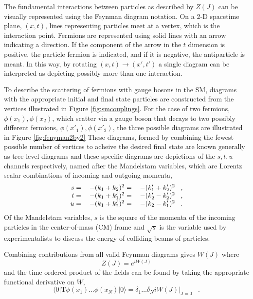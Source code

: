  The fundamental interactions between particles 
  as described by $Z(J)$ 
  can be visually represented using the Feynman
  diagram notation. 
 On a 2-D spacetime plane, $(x,t)$,
  lines representing particles meet
  at a vertex, which is the interaction point.
 Fermions are represented using solid lines
  with an arrow indicating a direction.
 If the component of the arrow in the $t$
  dimension is positive, the particle 
  fermion is indicated, and if it is 
  negative, the antiparticle is meant.
 In this way, by rotating $(x,t)\rightarrow (x',t')$
  a single diagram can be interpreted as 
  depicting possibly more than one interaction.

 To describe the scattering of fermions
  with gauge bosons in the SM,
  diagrams with the appropriate initial and final
  state particles are constructed from the 
  vertices illustrated in Figure \ref{fig:smcouplings}.
 For the case of two fermions, $\phi(x_1),\phi(x_2)$, which scatter
  via a gauge boson that decays
  to two possibly different fermions, $\phi(x'_1),\phi(x'_2)$,
  the three possible diagrams are
  illustrated in Figure \ref{fig:fenyman2by2}
 These diagrams, formed by combining the
  fewest possible number of vertices to 
  acheive the desired final state
  are known generally as tree-level diagrams
  and these specific diagrams
  are depictions of the $s,t,u$ channels respectively,
  named after the Mandelstam variables,
  which are Lorentz scalar
  combinations of incoming and outgoing momenta,
\begin{equation}
\begin{tabular}{rll} 
$ s = $ & $ - (k_1 + k_2)^2  = $ & $-(k_1' + k_2')^2\;\;\;,$ \\
$ t = $ & $ - (k_1 + k_1')^2 = $ & $-(k_2' - k_2')^2\;\;\;,$ \\
$ u = $ & $ - (k_1 + k_2')^2 = $ & $-(k_2 - k_1')^2 \;\;\;.$
\end{tabular}
\end{equation}
  Of the Mandelstam variables, $s$ is the square of the momenta
  of the incoming particles in the center-of-mass (CM)
  frame
  and $\sqrt{s}$ is the variable used by experimentalists
  to discuss the energy of colliding beams of particles.

 Combining contributions from all
  valid Feynman diagrams gives $W(J)$ where 
\begin{equation}
Z(J)=e^{iW(J)}
\end{equation}
  and the time ordered product of the fields
  can be found by taking the appropriate
  functional derivative on $W$,
\begin{equation}
 \langle 0 | \mathrm{T}\phi(x_1)\dots\phi(x_N) | 0 \rangle = 
  \delta_1\dots\delta_N i W(J) |_{J=0}\;\;\;.
\end{equation}
  

